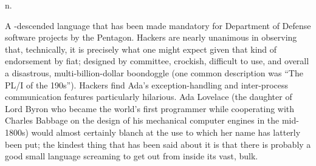  n.

A -descended language that has been made mandatory for Department of Defense software projects by the Pentagon. Hackers
are nearly unanimous in observing that, technically, it is precisely what one might expect given that kind of endorsement by fiat; designed
by committee, crockish, difficult to use, and overall a disastrous, multi-billion-dollar boondoggle (one common description was ``The PL/I
of the 190s''). Hackers find Ada's exception-handling and inter-process communication features particularly hilarious. Ada Lovelace (the
daughter of Lord Byron who became the world's first programmer while cooperating with Charles Babbage on the design of his mechanical
computer engines in the mid-1800s) would almost certainly blanch at the use to which her name has latterly been put; the kindest thing that
has been said about it is that there is probably a good small language screaming to get out from inside its vast, 
bulk.

